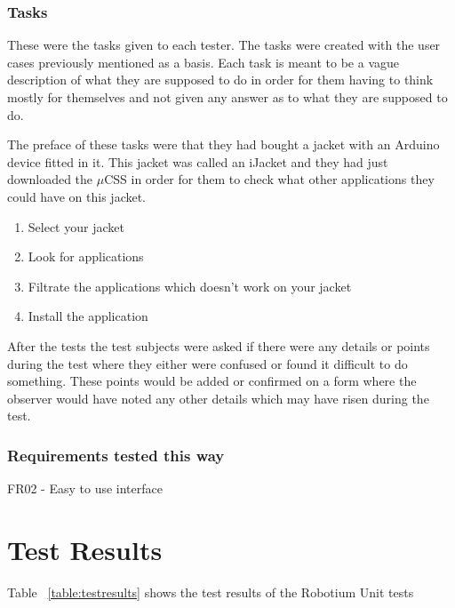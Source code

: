 		\subsubsection{Tasks}
		These were the tasks given to each tester. The tasks were created with the user cases previously mentioned as a basis. Each task is meant to be a vague description of what they are supposed to do in order for them having to think mostly for themselves and not given any answer as to what they are supposed to do. 

		The preface of these tasks were that they had bought a jacket with an Arduino device fitted in it. This jacket was called an iJacket and they had just downloaded the $\mu$CSS in order for them to check what other applications they could have on this jacket.

		\begin{enumerate}
		 \item Select your jacket
		 \item Look for applications
		 \item Filtrate the applications which doesn't work on your jacket
		 \item Install the application
		\end{enumerate}

		After the tests the test subjects were asked if there were any details or points during the test where they either were confused or found it difficult to do something. These points would be added or confirmed on a form where the observer would have noted any other details which may have risen during the test.

			\subsubsection{Requirements tested this way}
			FR02 - Easy to use interface

	\section{Test Results}

		Table ~\ref{table:testresults} shows the test results of the Robotium Unit tests

